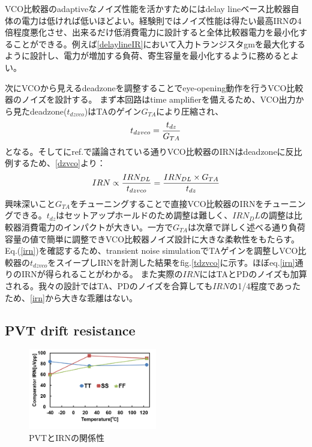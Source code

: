 \documentclass[letterpaper, 10 pt, conference]{ieeeconf}  %
\begin{document}
VCO比較器のadaptiveなノイズ性能を活かすためにはdelay lineベース比較器自体の電力は低ければ低いほどよい。経験則ではノイズ性能は得たい最高IRNの4倍程度悪化させ、出来るだけ低消費電力に設計すると全体比較器電力を最小化することができる。例えば\ref{delaylineIR}において入力トランジスタgmを最大化するように設計し、電力が増加する負荷、寄生容量を最小化するように務めるとよい。

次にVCOから見えるdeadzoneを調整することでeye-opening動作を行うVCO比較器のノイズを設計する。
まず本回路はtime amplifierを備えるため、VCO出力から見たdeadzone($t_{dzvco}$)はTAのゲイン$G_{TA}$により圧縮され、
\begin{eqnarray}
    \centering
    t_{dzvco} = \frac{t_{dz}}{G_{TA}}
    \label{dzvco}
\end{eqnarray}
となる。そしてにref.\cite{luo2020input, ding20190}で議論されている通りVCO比較器のIRNはdeadzoneに反比例するため、\ref{dzvco}より：
\begin{eqnarray}
    \centering
    IRN \propto \frac{IRN_{DL}}{t_{dzvco}} = \frac{IRN_{DL}\times G_{TA}}{t_{dz}}
    \label{irn}
\end{eqnarray}
興味深いこと$G_{TA}$をチューニングすることで直接VCO比較器のIRNをチューニングできる。$t_{dz}$はセットアップホールドのため調整は難しく、$IRN_DL$の調整は比較器消費電力のインパクトが大きい。一方で$G_{TA}$は次章で詳しく述べる通り負荷容量の値で簡単に調整できVCO比較器ノイズ設計に大きな柔軟性をもたらす。Eq.(\ref{irn})を確認するため、transient noise simulationでTAゲインを調整しVCO比較器の$t_{dzvco}$をスイープしIRNを計測した結果をfig.\ref{tdzvco}に示す。ほぼeq.\ref{irn}通りのIRNが得られることがわかる。
また実際の$IRN$にはTAとPDのノイズも加算される。我々の設計ではTA、PDのノイズを合算しても$IRN$の1/4程度であったため、\ref{irn}から大きな乖離はない。


\subsection{PVT drift resistance}
\begin{figure}[ht!]
\centering
 \includegraphics[width=0.5\textwidth]{figs/pvt_vco.png}
  \captionsetup{font=footnotesize}
  \caption{PVTとIRNの関係性}
  \label{pvtvco}
\end{figure}
\end{document}
